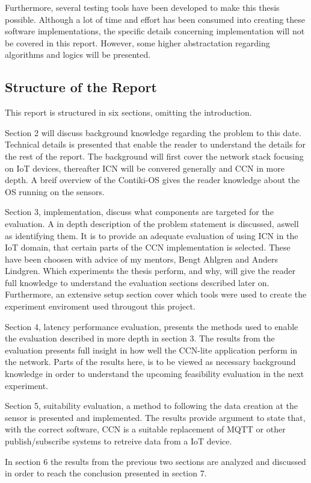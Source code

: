 Furthermore, several testing tools have been developed to make this thesis possible. Although a lot of time and effort has been consumed into creating these software implementations, the specific details concerning implementation will not be covered in this report. However, some higher abstractation regarding algorithms and logics will be presented.




\subsection{Structure of the Report}
This report is structured in six sections, omitting the introduction.

Section 2 will discuss background knowledge regarding the problem to this date. Technical details is presented that enable the reader to understand the details for the rest of the report. The background will first cover the network stack focusing on IoT devices, thereafter ICN will be convered generally and CCN in more depth. A breif overview of the Contiki-OS gives the reader knowledge about the OS running on the sensors.

Section 3, implementation, discuss what components are targeted for the evaluation. A in depth description of the problem statement is discussed, aswell as identifying them. It is to provide an adequate evaluation of using ICN in the IoT domain, that certain parts of the CCN implementation is selected. These have been choosen with advice of my mentors, Bengt Ahlgren and Anders Lindgren. Which experiments the thesis perform, and why, will give the reader full knowledge to understand the evaluation sections described later on. Furthermore, an extensive setup section cover which tools were used to create the experiment enviroment used througout this project.

Section 4, latency performance evaluation, presents the methods used to enable the evaluation described in more depth in section 3. The results from the evaluation presents full insight in how well the CCN-lite application perform in the network. Parts of the results here, is to be viewed as necessary background knowledge in order to understand the upcoming feasibility evaluation in the next experiment.

Section 5, suitability evaluation, a method to following the data creation at the sensor is presented and implemented. The results provide argument to state that, with the correct software, CCN is a suitable replacement of MQTT or other publish/subscribe systems to retreive data from a IoT device. 

In section 6 the results from the previous two sections are analyzed and discussed in order to reach the conclusion presented in section 7.